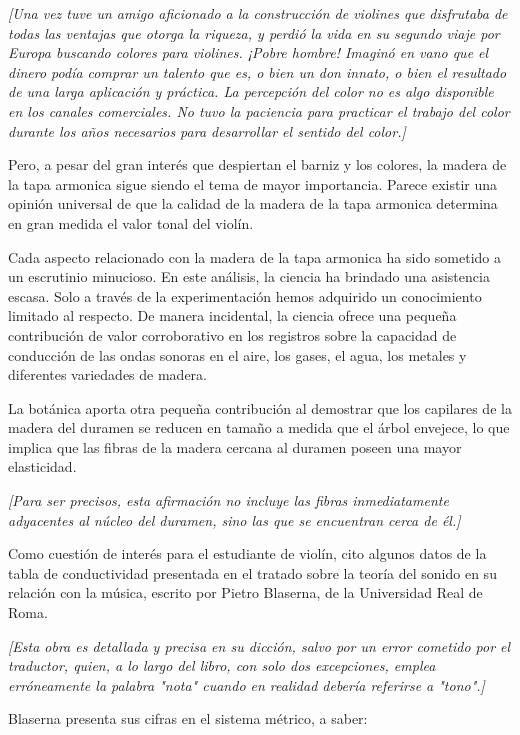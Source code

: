 \documentclass[12pt]{book}
\begin{document}
\textit{[Una vez tuve un amigo aficionado a la construcción de violines que disfrutaba de todas las ventajas que otorga la riqueza, y perdió la vida en su segundo viaje por Europa buscando colores para violines. ¡Pobre hombre! Imaginó en vano que el dinero podía comprar un talento que es, o bien un don innato, o bien el resultado de una larga aplicación y práctica. La percepción del color no es algo disponible en los canales comerciales. No tuvo la paciencia para practicar el trabajo del color durante los años necesarios para desarrollar el sentido del color.]}

Pero, a pesar del gran interés que despiertan el barniz y los colores, la madera de la tapa armonica sigue siendo el tema de mayor importancia. Parece existir una opinión universal de que la calidad de la madera de la tapa armonica determina en gran medida el valor tonal del violín.

Cada aspecto relacionado con la madera de la tapa armonica ha sido sometido a un escrutinio minucioso. En este análisis, la ciencia ha brindado una asistencia escasa. Solo a través de la experimentación hemos adquirido un conocimiento limitado al respecto. De manera incidental, la ciencia ofrece una pequeña contribución de valor corroborativo en los registros sobre la capacidad de conducción de las ondas sonoras en el aire, los gases, el agua, los metales y diferentes variedades de madera. 

La botánica aporta otra pequeña contribución al demostrar que los capilares de la madera del duramen se reducen en tamaño a medida que el árbol envejece, lo que implica que las fibras de la madera cercana al duramen poseen una mayor elasticidad.

\textit{[Para ser precisos, esta afirmación no incluye las fibras inmediatamente adyacentes al núcleo del duramen, sino las que se encuentran cerca de él.]}

Como cuestión de interés para el estudiante de violín, cito algunos datos de la tabla de conductividad presentada en el tratado sobre la teoría del sonido en su relación con la música, escrito por Pietro Blaserna, de la Universidad Real de Roma.

\textit{[Esta obra es detallada y precisa en su dicción, salvo por un error cometido por el traductor, quien, a lo largo del libro, con solo dos excepciones, emplea erróneamente la palabra "nota" cuando en realidad debería referirse a "tono".]}

Blaserna presenta sus cifras en el sistema métrico, a saber:
\end{document}
